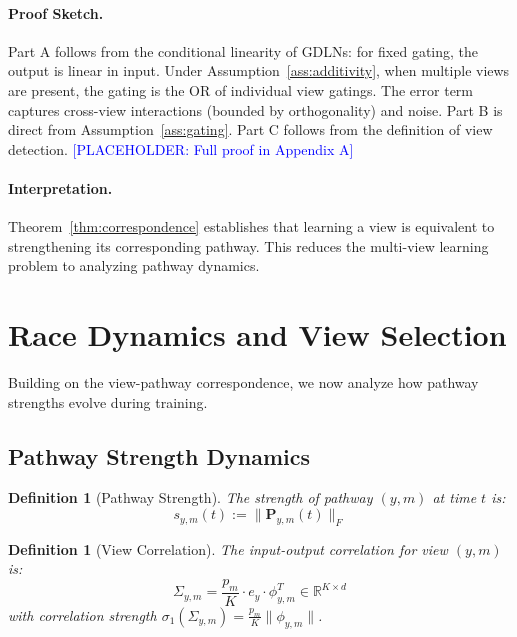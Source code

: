 \documentclass{article}
\newtheorem{definition}[theorem]{Definition}
\newcommand{\R}{\mathbb{R}}
\newcommand{\placeholder}[1]{\textcolor{blue}{[PLACEHOLDER: #1]}}
\begin{document}
\paragraph{Proof Sketch.} Part A follows from the conditional linearity of GDLNs: for fixed gating, the output is linear in input. Under Assumption~\ref{ass:additivity}, when multiple views are present, the gating is the OR of individual view gatings. The error term captures cross-view interactions (bounded by orthogonality) and noise. Part B is direct from Assumption~\ref{ass:gating}. Part C follows from the definition of view detection. \placeholder{Full proof in Appendix A}

\paragraph{Interpretation.} Theorem~\ref{thm:correspondence} establishes that learning a view is equivalent to strengthening its corresponding pathway. This reduces the multi-view learning problem to analyzing pathway dynamics.

\section{Race Dynamics and View Selection}
\label{sec:race}

Building on the view-pathway correspondence, we now analyze how pathway strengths evolve during training.

\subsection{Pathway Strength Dynamics}

\begin{definition}[Pathway Strength]
The strength of pathway $(y,m)$ at time $t$ is:
\begin{equation}
    s_{y,m}(t) := \|\mathbf{P}_{y,m}(t)\|_F
\end{equation}
\end{definition}

\begin{definition}[View Correlation]
The input-output correlation for view $(y,m)$ is:
\begin{equation}
    \Sigma_{y,m} = \frac{p_m}{K} \cdot e_y \cdot \phi_{y,m}^T \in \R^{K \times d}
\end{equation}
with correlation strength $\sigma_1(\Sigma_{y,m}) = \frac{p_m}{K} \|\phi_{y,m}\|$.
\end{definition}
\end{document}
